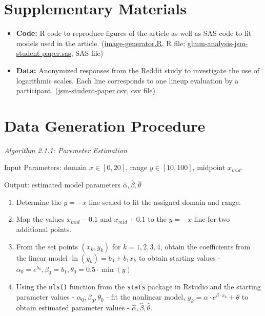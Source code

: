 \documentclass[]{interact}
\theoremstyle{plain}%
\theoremstyle{definition}
\theoremstyle{remark}
\begin{document}
\hypertarget{supplementary-materials}{%
\section*{Supplementary Materials}\label{supplementary-materials}}

\begin{itemize}
\item
  \textbf{Code:} R code to reproduce figures of the article as well as
  SAS code to fit models used in the article.
  (\href{https://github.com/srvanderplas/Perception-of-Log-Scales/blob/master/manuscripts/jsm-2021-student-paper-submission/code/image-generator.R}{image-generator.R},
  R file;
  \href{https://github.com/srvanderplas/Perception-of-Log-Scales/blob/master/lineups-pilot-analysis/sasCode/glmm-analysis-jsm-student-paper.sas}{glmm-analysis-jsm-student-paper.sas},
  SAS file)
\item
  \textbf{Data:} Anonymized responses from the Reddit study to
  investigate the use of logarithmic scales. Each line corresponds to
  one lineup evaluation by a participant.
  (\href{https://github.com/srvanderplas/Perception-of-Log-Scales/blob/master/lineups-pilot-analysis/data/jsm-student-paper-11302020.csv}{jsm-student-paper.csv},
  csv file)
\end{itemize}

\clearpage
\appendix

\hypertarget{data-generation-procedure}{%
\section{\texorpdfstring{Data Generation
Procedure\label{app:generation}}{Data Generation Procedure}}\label{data-generation-procedure}}

\textit{Algorithm 2.1.1: Paremeter Estimation}

Input Parameters: domain \(x\in[0,20]\), range \(y\in[10,100]\),
midpoint \(x_{mid}\).

Output: estimated model parameters \(\hat\alpha, \hat\beta, \hat\theta\)

\begin{enumerate}
\def\labelenumi{\arabic{enumi}.}
\item
  Determine the \(y=-x\) line scaled to fit the assigned domain and
  range.
\item
  Map the values \(x_{mid} - 0.1\) and \(x_{mid} + 0.1\) to the \(y=-x\)
  line for two additional points.
\item
  From the set points \((x_k, y_k)\) for \(k = 1,2,3,4\), obtain the
  coefficients from the linear model \(\ln(y_k) = b_0 +b_1x_k\) to
  obtain starting values -
  \(\alpha_0 = e^{b_0}, \beta_0 = b_1, \theta_0 = 0.5\cdot \min(y)\)
\item
  Using the \texttt{nls()} function from the \texttt{stats} package in
  Rstudio and the starting parameter values -
  \(\alpha_0, \beta_0, \theta_0\) - fit the nonlinear model,
  \(y_k = \alpha\cdot e^{\beta\cdot x_k}+\theta\) to obtain estimated
  parameter values - \(\hat\alpha, \hat\beta, \hat\theta.\)
\end{enumerate}
\end{document}
